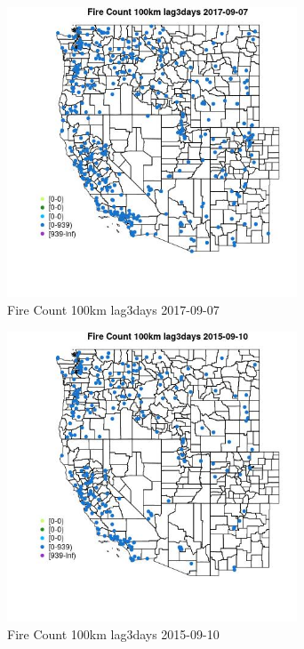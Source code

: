 \begin{figure} 
\centering  
\includegraphics[width=0.77\textwidth]{Code_Outputs/Report_ML_input_PM25_Step4_part_e_de_duplicated_aves_compiled_2019-05-20wNAs_MapObsFire_Count_100km_lag3days2017-09-07.jpg} 
\caption{\label{fig:Report_ML_input_PM25_Step4_part_e_de_duplicated_aves_compiled_2019-05-20wNAsMapObsFire_Count_100km_lag3days2017-09-07}Fire Count 100km lag3days 2017-09-07} 
\end{figure} 
 

\begin{figure} 
\centering  
\includegraphics[width=0.77\textwidth]{Code_Outputs/Report_ML_input_PM25_Step4_part_e_de_duplicated_aves_compiled_2019-05-20wNAs_MapObsFire_Count_100km_lag3days2015-09-10.jpg} 
\caption{\label{fig:Report_ML_input_PM25_Step4_part_e_de_duplicated_aves_compiled_2019-05-20wNAsMapObsFire_Count_100km_lag3days2015-09-10}Fire Count 100km lag3days 2015-09-10} 
\end{figure} 
 

